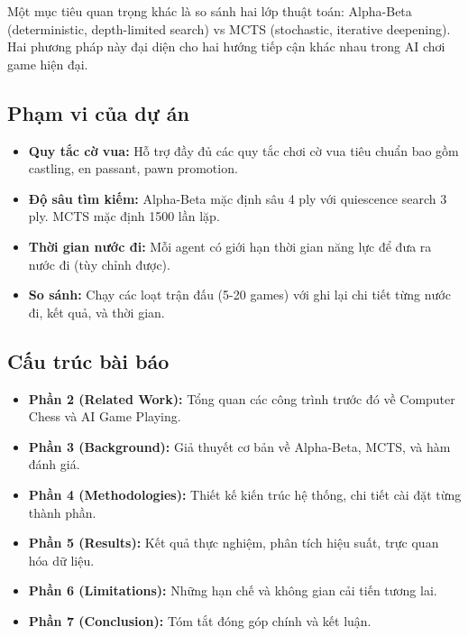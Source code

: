 Một mục tiêu quan trọng khác là so sánh hai lớp thuật toán: Alpha-Beta (deterministic, depth-limited search) vs MCTS (stochastic, iterative deepening). Hai phương pháp này đại diện cho hai hướng tiếp cận khác nhau trong AI chơi game hiện đại.

\subsection{Phạm vi của dự án}
\begin{itemize}
    \item \textbf{Quy tắc cờ vua:} Hỗ trợ đầy đủ các quy tắc chơi cờ vua tiêu chuẩn bao gồm castling, en passant, pawn promotion.
    \item \textbf{Độ sâu tìm kiếm:} Alpha-Beta mặc định sâu 4 ply với quiescence search 3 ply. MCTS mặc định 1500 lần lặp.
    \item \textbf{Thời gian nước đi:} Mỗi agent có giới hạn thời gian năng lực để đưa ra nước đi (tùy chỉnh được).
    \item \textbf{So sánh:} Chạy các loạt trận đấu (5-20 games) với ghi lại chi tiết từng nước đi, kết quả, và thời gian.
\end{itemize}

\subsection{Cấu trúc bài báo}
\begin{itemize}
    \item \textbf{Phần 2 (Related Work):} Tổng quan các công trình trước đó về Computer Chess và AI Game Playing.
    \item \textbf{Phần 3 (Background):} Giả thuyết cơ bản về Alpha-Beta, MCTS, và hàm đánh giá.
    \item \textbf{Phần 4 (Methodologies):} Thiết kế kiến trúc hệ thống, chi tiết cài đặt từng thành phần.
    \item \textbf{Phần 5 (Results):} Kết quả thực nghiệm, phân tích hiệu suất, trực quan hóa dữ liệu.
    \item \textbf{Phần 6 (Limitations):} Những hạn chế và không gian cải tiến tương lai.
    \item \textbf{Phần 7 (Conclusion):} Tóm tắt đóng góp chính và kết luận.
\end{itemize}


